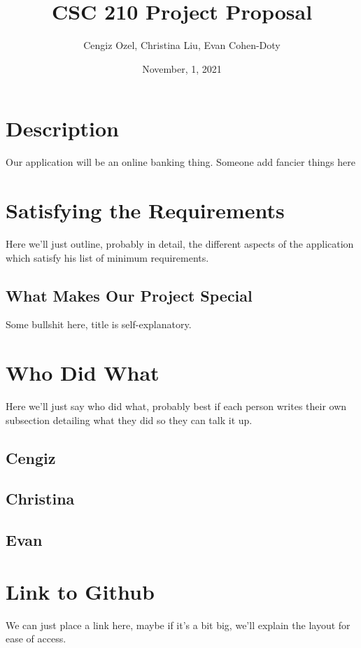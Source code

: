 \documentclass{article}
\title{CSC 210 Project Proposal}
\author{Cengiz Ozel, Christina Liu, Evan Cohen-Doty}
\date{November, 1, 2021}
\begin{document}
\maketitle

\section{Description}
Our application will be an online banking thing. Someone add fancier things here


\section{Satisfying the Requirements}

Here we'll just outline, probably in detail, the different aspects of the application which satisfy his list of minimum requirements.

\subsection{What Makes Our Project Special}

Some bullshit here, title is self-explanatory.

\section{Who Did What}

Here we'll just say who did what, probably best if each person writes their own subsection detailing what they did so they can talk it up.
\subsection{Cengiz}

\subsection{Christina}

\subsection{Evan}

\section{Link to Github}

We can just place a link here, maybe if it's a bit big, we'll explain the layout for ease of access.
\end{document}

